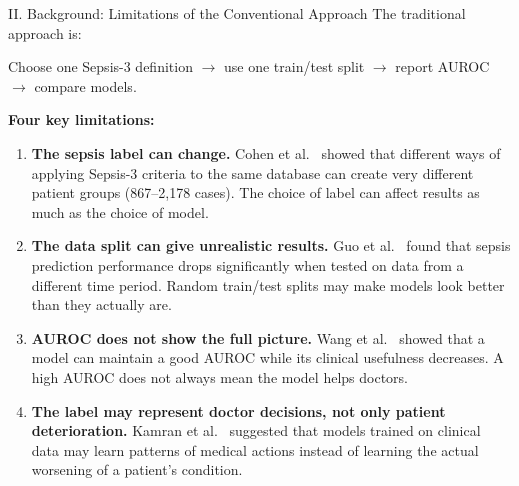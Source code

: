 \begin{frame}{II. Background: Limitations of the Conventional Approach}
The traditional approach is:

\vspace{2pt}
{\centering Choose one Sepsis-3 definition $\rightarrow$ use one train/test
split $\rightarrow$ report AUROC $\rightarrow$ compare models.\par}

\vspace{4pt}
\textbf{Four key limitations:}
\vspace{-2pt}
\begin{enumerate}\itemsep1pt\footnotesize
  \item \textbf{The sepsis label can change.} Cohen et
        al.~\cite{cohen2024subtle} showed that different ways of applying
        Sepsis-3 criteria to the same database can create very different
        patient groups (867--2,178 cases). The choice of label can affect
        results as much as the choice of model.
  \item \textbf{The data split can give unrealistic results.} Guo et
        al.~\cite{guo2022temporal} found that sepsis prediction performance
        drops significantly when tested on data from a different time period.
        Random train/test splits may make models look better than they
        actually are.
  \item \textbf{AUROC does not show the full picture.} Wang et
        al.~\cite{wang2025srpm} showed that a model can maintain a good AUROC
        while its clinical usefulness decreases. A high AUROC does not always
        mean the model helps doctors.
  \item \textbf{The label may represent doctor decisions, not only patient
        deterioration.} Kamran et al.~\cite{kamran2024evaluation} suggested
        that models trained on clinical data may learn patterns of medical
        actions instead of learning the actual worsening of a patient's
        condition.
\end{enumerate}
\end{frame}


